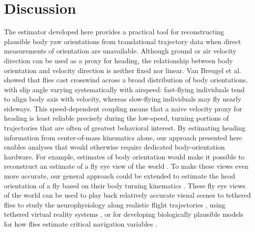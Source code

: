 \documentclass[11pt]{article}
\begin{document}
\section*{Discussion}
 
The estimator developed here provides a practical tool for reconstructing plausible body yaw orientations from translational trajectory data when direct measurements of orientation are unavailable. 
Although ground or air velocity direction can be used as a proxy for heading, the relationship between
body orientation and velocity direction is neither fixed nor linear. Van Breugel et al. \citep{van2014plume} showed that flies cast crosswind across a broad distribution of body orientations, with slip angle varying systematically with airspeed: fast-flying individuals tend to align body axis with velocity, whereas slow-flying individuals may fly nearly sideways. This speed-dependent coupling means that a naive velocity proxy for heading is least reliable precisely during the low-speed, turning portions of trajectories that are often of greatest behavioral interest.
By estimating heading information from center-of-mass kinematics alone, our approach presented here enables analyses that would otherwise require dedicated body-orientation hardware. For example, estimates of body orientation would make it possible to reconstruct an estimate of a fly eye view of the world \citep{straw2011multi}. 
To make these views even more accurate, our general approach could be extended to estimate the head orientation of a fly based on their body turning kinematics \citep{cellini2021mechanisms}. These fly eye views of the world can be used to play back relatively accurate visual scenes to tethered flies to study the neurophysiology along realistic flight trajectories \citep{kern2005function, boeddeker2005responses}, using tethered virtual reality systems \citep{kaushik2020characterizing}, or for developing biologically plausible models for how flies estimate critical navigation variables \citep{may2025compact}. 
\end{document}
